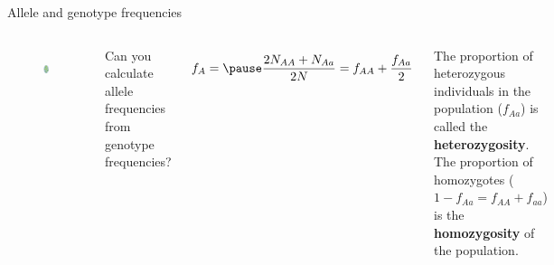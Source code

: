 \begin{frame}{Allele and genotype frequencies}

        \begin{columns}


                \begin{figure}
                        \includegraphics[width=0.8\textwidth]{Pics/population} \
                \end{figure}


                \small
		Can you calculate allele frequencies from genotype frequencies?

                \begin{equation}
                        f_A = \pause \frac{2N_{AA} + N_{Aa}}{2N} = f_{AA} + \frac{f_{Aa}}{2}
                \end{equation}

                \bigskip

                The proportion of heterozygous individuals in the population ($f_{Aa}$) is called
		the \textbf{heterozygosity}.
		\vskip 0.4cm
		The proportion of homozygotes ($1 - f_{Aa} = f_{AA} + f_{aa}$) is the \textbf{homozygosity} 
		of the population.

        \end{columns}

\end{frame}


